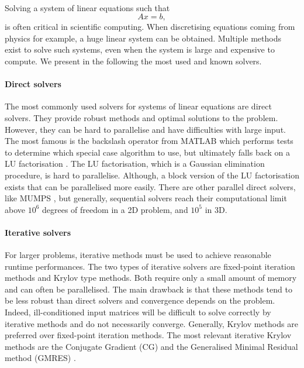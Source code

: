 \paragraph{}
Solving a system of linear equations such that
\[Ax = b,\]
is often critical in scientific computing.
When discretising equations coming from physics for example, a huge linear system can be obtained.
Multiple methods exist to solve such systems, even when the system is large and expensive to compute.
We present in the following the most used and known solvers.

\paragraph{Direct solvers}
The most commonly used solvers for systems of linear equations are direct solvers.
They provide robust methods and optimal solutions to the problem.
However, they can be hard to parallelise and have difficulties with large input.
The most famous is the backslash operator from MATLAB which performs tests to determine which special case algorithm to use, but ultimately falls back on a LU factorisation \cite{mldivide_matlab}.
The LU factorisation, which is a Gaussian elimination procedure, is hard to parallelise.
Although, a block version of the LU factorisation exists that can be parallelised more easily.
There are other parallel direct solvers, like MUMPS \cite{MUMPS_2001}, but generally, sequential solvers reach their computational limit above \(10^6\) degrees of freedom in a 2D problem, and \(10^5\) in 3D.

\paragraph{Iterative solvers}
For larger problems, iterative methods must be used to achieve reasonable runtime performances.
The two types of iterative solvers are fixed-point iteration methods and Krylov type methods.
Both require only a small amount of memory and can often be parallelised.
The main drawback is that these methods tend to be less robust than direct solvers and convergence depends on the problem.
Indeed, ill-conditioned input matrices will be difficult to solve correctly by iterative methods and do not necessarily converge.
Generally, Krylov methods are preferred over fixed-point iteration methods.
The most relevant iterative Krylov methods are the Conjugate Gradient (CG) and the Generalised Minimal Residual method (GMRES) \cite{saad_iterative_2003} \cite{saad_gmres_1986}.

